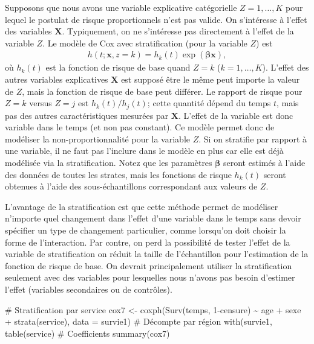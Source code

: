 \documentclass[
  11pt,
  letterpaper,
]{book}
\newenvironment{Shaded}{\begin{snugshade}}{\end{snugshade}}
\newcommand{\AttributeTok}[1]{\textcolor[rgb]{0.40,0.45,0.13}{#1}}
\newcommand{\CommentTok}[1]{\textcolor[rgb]{0.37,0.37,0.37}{#1}}
\newcommand{\DecValTok}[1]{\textcolor[rgb]{0.68,0.00,0.00}{#1}}
\newcommand{\FunctionTok}[1]{\textcolor[rgb]{0.28,0.35,0.67}{#1}}
\newcommand{\NormalTok}[1]{\textcolor[rgb]{0.00,0.23,0.31}{#1}}
\newcommand{\OtherTok}[1]{\textcolor[rgb]{0.00,0.23,0.31}{#1}}
\newcommand{\SpecialCharTok}[1]{\textcolor[rgb]{0.37,0.37,0.37}{#1}}
\theoremstyle{definition}
\theoremstyle{remark}
\begin{document}
Supposons que nous avons une variable explicative catégorielle
\(Z=1, \ldots, K\) pour lequel le postulat de risque proportionnels
n'est pas valide. On s'intéresse à l'effet des variables \(\mathbf{X}\).
Typiquement, on ne s'intéresse pas directement à l'effet de la variable
\(Z\). Le modèle de Cox avec stratification (pour la variable \(Z\)) est
\begin{align*}
h(t; \mathbf{x}, z=k) = h_k(t) \exp(\boldsymbol{\beta} \mathbf{x}),
\end{align*} où \(h_k(t)\) est la fonction de risque de base quand
\(Z=k\) (\(k=1, \ldots, K\)). L'effet des autres variables explicatives
\(\mathbf{X}\) est supposé être le même peut importe la valeur de \(Z\),
mais la fonction de risque de base peut différer. Le rapport de risque
pour \(Z=k\) versus \(Z=j\) est \(h_k(t)/h_j(t)\); cette quantité dépend
du temps \(t\), mais pas des autres caractéristiques mesurées par
\(\mathbf{X}\). L'effet de la variable est donc variable dans le temps
(et non pas constant). Ce modèle permet donc de modéliser la
non-proportionnalité pour la variable \(Z\). Si on stratifie par rapport
à une variable, il ne faut pas l'inclure dans le modèle en plus car elle
est déjà modélisée via la stratification. Notez que les paramètres
\(\boldsymbol{\beta}\) seront estimés à l'aide des données de toutes les
strates, mais les fonctions de risque \(h_k(t)\) seront obtenues à
l'aide des sous-échantillons correspondant aux valeurs de \(Z\).

L'avantage de la stratification est que cette méthode permet de
modéliser n'importe quel changement dans l'effet d'une variable dans le
temps sans devoir spécifier un type de changement particulier, comme
lorsqu'on doit choisir la forme de l'interaction. Par contre, on perd la
possibilité de tester l'effet de la variable de stratification on réduit
la taille de l'échantillon pour l'estimation de la fonction de risque de
base. On devrait principalement utiliser la stratification seulement
avec des variables pour lesquelles nous n'avons pas besoin d'estimer
l'effet (variables secondaires ou de contrôles).

\begin{Shaded}
\begin{Highlighting}[]
\CommentTok{\# Stratification par service}
\NormalTok{cox7 }\OtherTok{\textless{}{-}} \FunctionTok{coxph}\NormalTok{(}\FunctionTok{Surv}\NormalTok{(temps, }\DecValTok{1}\SpecialCharTok{{-}}\NormalTok{censure) }\SpecialCharTok{\textasciitilde{}} 
\NormalTok{                age }\SpecialCharTok{+}\NormalTok{ sexe }\SpecialCharTok{+} \FunctionTok{strata}\NormalTok{(service), }
              \AttributeTok{data =}\NormalTok{ survie1)}
\CommentTok{\# Décompte par région}
\FunctionTok{with}\NormalTok{(survie1, }\FunctionTok{table}\NormalTok{(service)}
\CommentTok{\# Coefficients}
\FunctionTok{summary}\NormalTok{(cox7)}
\end{Highlighting}
\end{Shaded}
\end{document}
